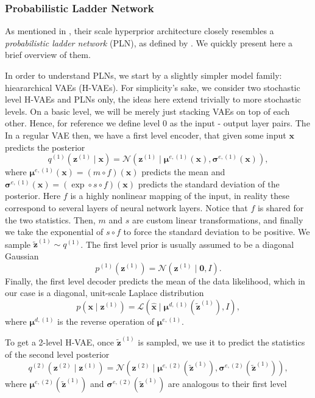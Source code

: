 \documentclass{article}
\renewcommand{\vec}[1]{\mathbf{#1}}
\newcommand{\Norm}[1]{\mathcal{N}\left( #1 \right)}
\newcommand{\Laplace}[1]{\mathcal{L}\left( #1 \right)}
\newcommand{\MU}{\boldsymbol\mu}
\newcommand{\SIGMA}{\boldsymbol\sigma}
\begin{document}
\subsubsection{Probabilistic Ladder Network}
\par
As mentioned in \cite{balle2018variational}, their scale hyperprior architecture
closely resembles a \textit{probabilistic ladder network} (PLN), as defined by
\cite{sonderby2016train}. We quickly present here a brief overview of them.
\par
In order to understand PLNs, we start by a slightly simpler model family:
hieararchical VAEs (H-VAEs). For simplicity's sake, we consider two stochastic
level H-VAEs and PLNs only, the ideas here extend trivially to more stochastic levels.
On a basic level, we will be merely just stacking VAEs on top of each other.
Hence, for reference we define level 0 as the input - output layer pairs. The
In a regular VAE then, we have a first level encoder, that given some input
$\vec{x}$ predicts the posterior
\[
  q^{(1)}(\vec{z}^{(1)} \mid \vec{x}) = \Norm{\vec{z}^{(1)} \mid
  \MU^{e, (1)}(\vec{x}), \SIGMA^{e, (1)}(\vec{x})},
\]
where $\MU^{e, (1)}(\vec{x}) = (m \circ f)(\vec{x})$ predicts the mean and
$\SIGMA^{e, (1)}(\vec{x}) = (\exp \circ s \circ f)(\vec{x})$ predicts the
standard deviation of the posterior. Here $f$ is a highly nonlinear mapping of
the input, in reality these correspond to several layers of neural network
layers. Notice that $f$ is shared for the two statistics. Then, $m$ and $s$ are
custom linear transformations, and finally we take the exponential of $s \circ f
$ to force the standard deviation to be positive. We sample $\vec{\tilde{z}}^{(1)}
\sim q^{(1)}$.
The first level prior is usually assumed to be a diagonal Gaussian
\[
  p^{(1)}(\vec{z}^{(1)})  = \Norm{\vec{z}^{(1)} \mid \vec{0}, I}.
\]
Finally, the first level decoder predicts the mean of the data likelihood,
which in our case is a diagonal, unit-scale Laplace distribution
\[
  p(\vec{x} \mid \vec{z}^{(1)}) = \Laplace{\vec{\hat{x}} \mid
  \MU^{d, (1)}(\vec{\tilde{z}}^{(1)}), I},
\]
where $\MU^{d, (1)}$ is the reverse operation of $\MU^{e, (1)}$.
\par
To get a 2-level H-VAE, once $\vec{\tilde{z}}^{(1)}$ is sampled, we use it to predict
the statistics of the second level posterior
\[
  q^{(2)}(\vec{z}^{(2)} \mid \vec{z}^{(1)}) = \Norm{\vec{z}^{(2)} \mid 
  \MU^{e, (2)}(\vec{\tilde{z}}^{(1)}), \SIGMA^{e, (2)}(\vec{\tilde{z}}^{(1)})},
\]
where $\MU^{e, (2)}(\vec{\tilde{z}}^{(1)})$ and
$\SIGMA^{e, (2)}(\vec{\tilde{z}}^{(1)})$ are analogous to their first level
\end{document}
